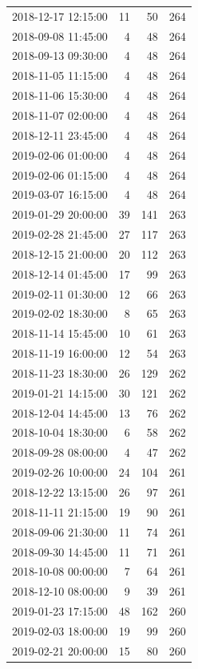 \begin{tabular}{lrrr}
2018-12-17 12:15:00 & 11 & 50 & 264 \\
2018-09-08 11:45:00 & 4 & 48 & 264 \\
2018-09-13 09:30:00 & 4 & 48 & 264 \\
2018-11-05 11:15:00 & 4 & 48 & 264 \\
2018-11-06 15:30:00 & 4 & 48 & 264 \\
2018-11-07 02:00:00 & 4 & 48 & 264 \\
2018-12-11 23:45:00 & 4 & 48 & 264 \\
2019-02-06 01:00:00 & 4 & 48 & 264 \\
2019-02-06 01:15:00 & 4 & 48 & 264 \\
2019-03-07 16:15:00 & 4 & 48 & 264 \\
2019-01-29 20:00:00 & 39 & 141 & 263 \\
2019-02-28 21:45:00 & 27 & 117 & 263 \\
2018-12-15 21:00:00 & 20 & 112 & 263 \\
2018-12-14 01:45:00 & 17 & 99 & 263 \\
2019-02-11 01:30:00 & 12 & 66 & 263 \\
2019-02-02 18:30:00 & 8 & 65 & 263 \\
2018-11-14 15:45:00 & 10 & 61 & 263 \\
2018-11-19 16:00:00 & 12 & 54 & 263 \\
2018-11-23 18:30:00 & 26 & 129 & 262 \\
2019-01-21 14:15:00 & 30 & 121 & 262 \\
2018-12-04 14:45:00 & 13 & 76 & 262 \\
2018-10-04 18:30:00 & 6 & 58 & 262 \\
2018-09-28 08:00:00 & 4 & 47 & 262 \\
2019-02-26 10:00:00 & 24 & 104 & 261 \\
2018-12-22 13:15:00 & 26 & 97 & 261 \\
2018-11-11 21:15:00 & 19 & 90 & 261 \\
2018-09-06 21:30:00 & 11 & 74 & 261 \\
2018-09-30 14:45:00 & 11 & 71 & 261 \\
2018-10-08 00:00:00 & 7 & 64 & 261 \\
2018-12-10 08:00:00 & 9 & 39 & 261 \\
2019-01-23 17:15:00 & 48 & 162 & 260 \\
2019-02-03 18:00:00 & 19 & 99 & 260 \\
2019-02-21 20:00:00 & 15 & 80 & 260 \\

\end{tabular}
